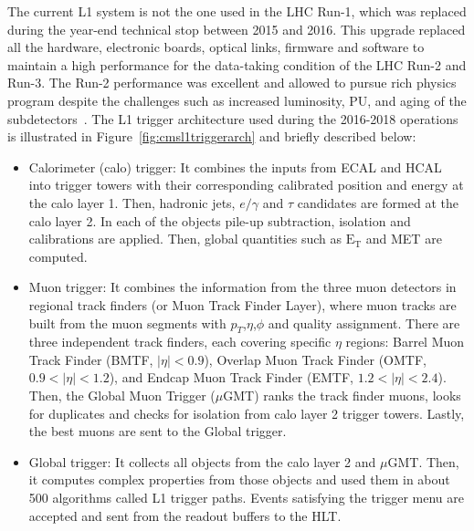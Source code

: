 The current L1 system is not the one used in the LHC Run-1, which was replaced during the year-end technical stop between 2015 and 2016. This upgrade replaced all the hardware, electronic boards, optical links, firmware and software to maintain a high performance for the data-taking condition of the LHC Run-2 and Run-3. The Run-2 performance was excellent and allowed to pursue rich physics program despite the challenges such as increased luminosity, PU, and aging of the subdetectors~\cite{cmsphase1per}. The L1 trigger architecture used during the 2016-2018 operations is illustrated in Figure~\ref{fig:cmsl1triggerarch} and briefly described below: 
\begin{itemize}
    \item Calorimeter (calo) trigger: It combines the inputs from ECAL and HCAL into trigger towers with their corresponding calibrated position and energy at the calo layer 1. Then, hadronic jets, $e/\gamma$ and $\tau$ candidates are formed at the calo layer 2. In each of the objects pile-up subtraction, isolation and calibrations are applied. Then, global quantities such as $\mathrm{E_{T}}$ and MET are computed.
    \item  Muon trigger: It combines the information from the three muon detectors in regional track finders (or Muon Track Finder Layer), where muon tracks are built from the muon segments with $p_{T}$,$\eta$,$\phi$ and quality assignment. There are three independent track finders, each covering specific $\eta$ regions: Barrel Muon Track Finder (BMTF, $|\eta|<0.9$), Overlap Muon Track Finder (OMTF, $0.9<|\eta|<1.2$), and Endcap Muon Track Finder (EMTF, $1.2<|\eta|<2.4$). Then, the Global Muon Trigger ($\mu$GMT) ranks the track finder muons, looks for duplicates and checks for isolation from calo layer 2 trigger towers. Lastly, the best muons are sent to the Global trigger.
    \item Global trigger: It collects all objects from the calo layer 2 and $\mu$GMT. Then, it computes complex properties from those objects and used them in about 500 algorithms called L1 trigger paths. Events satisfying the trigger menu are accepted and sent from the readout buffers to the HLT. 
\end{itemize}

